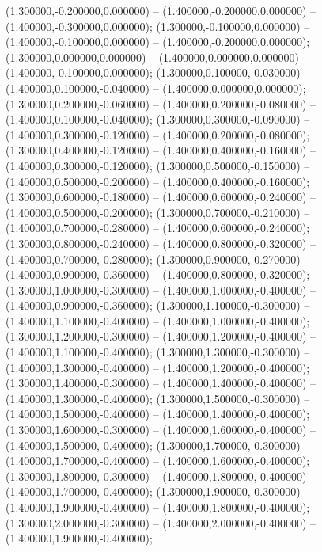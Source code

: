 (1.300000,-0.200000,0.000000) -- (1.400000,-0.200000,0.000000) -- (1.400000,-0.300000,0.000000);
 (1.300000,-0.100000,0.000000) -- (1.400000,-0.100000,0.000000) -- (1.400000,-0.200000,0.000000);
 (1.300000,0.000000,0.000000) -- (1.400000,0.000000,0.000000) -- (1.400000,-0.100000,0.000000);
 (1.300000,0.100000,-0.030000) -- (1.400000,0.100000,-0.040000) -- (1.400000,0.000000,0.000000);
 (1.300000,0.200000,-0.060000) -- (1.400000,0.200000,-0.080000) -- (1.400000,0.100000,-0.040000);
 (1.300000,0.300000,-0.090000) -- (1.400000,0.300000,-0.120000) -- (1.400000,0.200000,-0.080000);
 (1.300000,0.400000,-0.120000) -- (1.400000,0.400000,-0.160000) -- (1.400000,0.300000,-0.120000);
 (1.300000,0.500000,-0.150000) -- (1.400000,0.500000,-0.200000) -- (1.400000,0.400000,-0.160000);
 (1.300000,0.600000,-0.180000) -- (1.400000,0.600000,-0.240000) -- (1.400000,0.500000,-0.200000);
 (1.300000,0.700000,-0.210000) -- (1.400000,0.700000,-0.280000) -- (1.400000,0.600000,-0.240000);
 (1.300000,0.800000,-0.240000) -- (1.400000,0.800000,-0.320000) -- (1.400000,0.700000,-0.280000);
 (1.300000,0.900000,-0.270000) -- (1.400000,0.900000,-0.360000) -- (1.400000,0.800000,-0.320000);
 (1.300000,1.000000,-0.300000) -- (1.400000,1.000000,-0.400000) -- (1.400000,0.900000,-0.360000);
 (1.300000,1.100000,-0.300000) -- (1.400000,1.100000,-0.400000) -- (1.400000,1.000000,-0.400000);
 (1.300000,1.200000,-0.300000) -- (1.400000,1.200000,-0.400000) -- (1.400000,1.100000,-0.400000);
 (1.300000,1.300000,-0.300000) -- (1.400000,1.300000,-0.400000) -- (1.400000,1.200000,-0.400000);
 (1.300000,1.400000,-0.300000) -- (1.400000,1.400000,-0.400000) -- (1.400000,1.300000,-0.400000);
 (1.300000,1.500000,-0.300000) -- (1.400000,1.500000,-0.400000) -- (1.400000,1.400000,-0.400000);
 (1.300000,1.600000,-0.300000) -- (1.400000,1.600000,-0.400000) -- (1.400000,1.500000,-0.400000);
 (1.300000,1.700000,-0.300000) -- (1.400000,1.700000,-0.400000) -- (1.400000,1.600000,-0.400000);
 (1.300000,1.800000,-0.300000) -- (1.400000,1.800000,-0.400000) -- (1.400000,1.700000,-0.400000);
 (1.300000,1.900000,-0.300000) -- (1.400000,1.900000,-0.400000) -- (1.400000,1.800000,-0.400000);
 (1.300000,2.000000,-0.300000) -- (1.400000,2.000000,-0.400000) -- (1.400000,1.900000,-0.400000);
